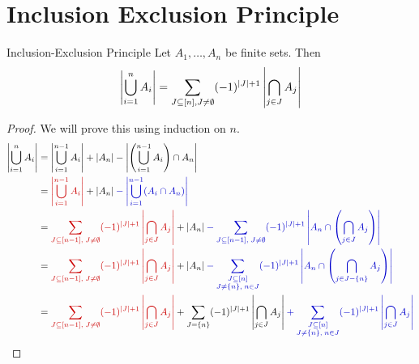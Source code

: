 \section{Inclusion Exclusion Principle}
\begin{Theorem}{Inclusion-Exclusion Principle}{}
	Let $A_1,\dots, A_n$ be finite sets. Then $$\left|\bigcup_{i=1}^nA_i\right|=\sum_{J\subseteq [n], J\neq\emptyset}(-1)^{|J|+1}\left|\bigcap_{j\in J}A_j\right|$$
\end{Theorem}
\begin{proof}
	We will prove this using induction on $n$.\begin{align*}
		\lt|\bigcup\limits_{i=1}^{n}A_i\rt| & = \lt|\bigcup_{i=1}^{n-1} A_i\rt|+  |A_{n}|-  \lt|\lt(\bigcup_{i=1}^{n-1} A_i \rt)\cap A_{n}\rt|                                                                                                                                                                                                  \\
		                                    & =  \mathcolor{red!80!black}{\lt|\bigcup\limits_{i=1}^{n-1}A_i\rt|}+|A_n|\mathcolor{blue!80!black}{-\lt|\bigcup_{i=1}^{n-1}(A_i\cap A_n)   \rt|                                                                                                                     }                                       \\
		                                    & = \mathcolor{red!80!black}{\sum_{J\subseteq [n-1],\; J\neq\emptyset}(-1)^{|J|+1}\lt|\bigcap_{j\in J}A_j\rt| }+|A_n|\mathcolor{blue!80!black}{-\sum_{J\subseteq[n-1],\; J\neq\emptyset} (-1)^{|J|+1}\lt|A_n\cap\lt(\bigcap_{j\in J}A_j\rt)\rt|    }                                                               \\
		                                    & =  \mathcolor{red!80!black}{\sum_{J\subseteq [n-1],\; J\neq\emptyset}(-1)^{|J|+1}\lt|\bigcap_{j\in J}A_j\rt| }+|A_n|\mathcolor{blue!80!black}{-\sum_{\substack{J\subseteq[n]\\ J\neq\{n\},\; n\in J}} (-1)^{|J|+1}\lt|A_n\cap\lt(\bigcap_{j\in J-\{n\}}A_j\rt)\rt|                     }                         \\
		                                    & = \mathcolor{red!80!black}{ \sum_{J\subseteq [n-1],\; J\neq\emptyset}(-1)^{|J|+1}\lt|\bigcap_{j\in J}A_j\rt|       }   +\sum_{J=\{n\}}(-1)^{|J|+1}\lt|\bigcap_{j\in J} A_j \rt|       \mathcolor{blue!80!black}{+\sum_{\substack{J\subseteq[n]\\ J\neq\{n\},\; n\in J}} (-1)^{|J|+1}\lt|\bigcap_{j\in J}A_j\rt|}\\

\end{align*}
\end{proof}
